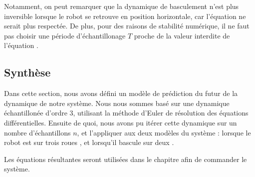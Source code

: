 					Notamment, on peut remarquer que la dynamique de basculement n'est plus inversible lorsque le robot se retrouve en position horizontale, car l'équation  ne serait plus respectée.
					De plus, pour des raisons de stabilité numérique, il ne faut pas choisir une période d'échantillonage $T$ proche de la valeur interdite de l'équation .
					
		\subsection{Synthèse}
		
			Dans cette section, nous avons défini un modèle de prédiction du futur de la dynamique de notre système. 
			Nous nous sommes basé sur une dynamique échantillonée d'ordre 3, utilisant la méthode d'Euler de résolution des équations différentielles.
			Ensuite de quoi, nous avons pu itérer cette dynamique sur un nombre d'échantillons $n$, et l'appliquer aux deux modèles du système : lorsque le robot est sur trois roues , et lorsqu'il bascule sur deux .  
			
			Les équations résultantes  seront utilisées dans le chapitre  afin de commander le système.